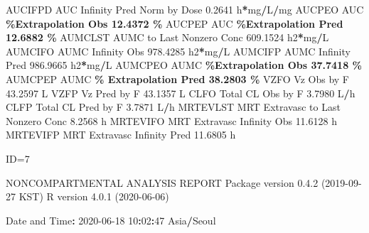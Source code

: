 \documentclass[
  10pt,
]{krantz}
\makeatletter
\newenvironment{Shaded}{\begin{snugshade}}{\end{snugshade}}
\newcommand{\DecValTok}[1]{\textcolor[rgb]{0.00,0.00,0.81}{#1}}
\newcommand{\FloatTok}[1]{\textcolor[rgb]{0.00,0.00,0.81}{#1}}
\newcommand{\NormalTok}[1]{#1}
\newcommand{\OperatorTok}[1]{\textcolor[rgb]{0.81,0.36,0.00}{\textbf{#1}}}
\newcommand{\StringTok}[1]{\textcolor[rgb]{0.31,0.60,0.02}{#1}}
\newenvironment{kframe}{%
\medskip{}
\setlength{\fboxsep}{.8em}
 \def\at@end@of@kframe{}%
 \ifinner\ifhmode%
  \def\at@end@of@kframe{\end{minipage}}%
  \begin{minipage}{\columnwidth}%
 \fi\fi%
 \def\FrameCommand##1{\hskip\@totalleftmargin \hskip-\fboxsep
 \colorbox{shadecolor}{##1}\hskip-\fboxsep
     \hskip-\linewidth \hskip-\@totalleftmargin \hskip\columnwidth}%
 \MakeFramed {\advance\hsize-\width
   \@totalleftmargin\z@ \linewidth\hsize
   \@setminipage}}%
 {\par\unskip\endMakeFramed%
 \at@end@of@kframe}
\renewenvironment{Shaded}{\begin{kframe}}{\end{kframe}}
\makeatother
\begin{document}
\begin{Shaded}
\begin{Highlighting}[]
\NormalTok{AUCIFPD    AUC Infinity Pred Norm by Dose                  }\FloatTok{0.2641}\NormalTok{ h}\OperatorTok{*}\NormalTok{mg}\OperatorTok{/}\NormalTok{L}\OperatorTok{/}\NormalTok{mg}
\NormalTok{AUCPEO     AUC }\OperatorTok{\%Extrapolation Obs                         12.4372 \%}
\NormalTok{AUCPEP     AUC }\OperatorTok{\%Extrapolation Pred                        12.6882 \%}
\NormalTok{AUMCLST    AUMC to Last Nonzero Conc                     }\FloatTok{609.1524}\NormalTok{ h2}\OperatorTok{*}\NormalTok{mg}\OperatorTok{/}\NormalTok{L}
\NormalTok{AUMCIFO    AUMC Infinity Obs                             }\FloatTok{978.4285}\NormalTok{ h2}\OperatorTok{*}\NormalTok{mg}\OperatorTok{/}\NormalTok{L}
\NormalTok{AUMCIFP    AUMC Infinity Pred                            }\FloatTok{986.9665}\NormalTok{ h2}\OperatorTok{*}\NormalTok{mg}\OperatorTok{/}\NormalTok{L}
\NormalTok{AUMCPEO    AUMC }\OperatorTok{\%Extrapolation Obs                        37.7418 \%}
\NormalTok{AUMCPEP    AUMC }\OperatorTok{\% Extrapolation Pred                      38.2803 \%}
\NormalTok{VZFO       Vz Obs by F                                    }\FloatTok{43.2597}\NormalTok{ L}
\NormalTok{VZFP       Vz Pred by F                                   }\FloatTok{43.1357}\NormalTok{ L}
\NormalTok{CLFO       Total CL Obs by F                               }\FloatTok{3.7980}\NormalTok{ L}\OperatorTok{/}\NormalTok{h}
\NormalTok{CLFP       Total CL Pred by F                              }\FloatTok{3.7871}\NormalTok{ L}\OperatorTok{/}\NormalTok{h}
\NormalTok{MRTEVLST   MRT Extravasc to Last Nonzero Conc              }\FloatTok{8.2568}\NormalTok{ h}
\NormalTok{MRTEVIFO   MRT Extravasc Infinity Obs                     }\FloatTok{11.6128}\NormalTok{ h}
\NormalTok{MRTEVIFP   MRT Extravasc Infinity Pred                    }\FloatTok{11.6805}\NormalTok{ h}





\NormalTok{ID=}\DecValTok{7}

\NormalTok{                        NONCOMPARTMENTAL ANALYSIS REPORT}
\NormalTok{                       Package version }\DecValTok{0}\NormalTok{.}\FloatTok{4.2}\NormalTok{ (}\DecValTok{2019{-}09{-}27}\NormalTok{ KST)}
\NormalTok{                          R version }\DecValTok{4}\NormalTok{.}\FloatTok{0.1}\NormalTok{ (}\DecValTok{2020{-}06{-}06}\NormalTok{)}

\NormalTok{Date and Time}\OperatorTok{:}\StringTok{ }\DecValTok{2020{-}06{-}18} \DecValTok{10}\OperatorTok{:}\DecValTok{02}\OperatorTok{:}\DecValTok{47}\NormalTok{ Asia}\OperatorTok{/}\NormalTok{Seoul}


\end{Highlighting}
\end{Shaded}
\end{document}
